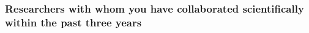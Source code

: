 \documentclass[10pt,fleqn,twoside]{article}
\newcommand{\Tcol}{\color{blue}}
\begin{document}
\subsubsection{\Tcol Researchers with whom you have collaborated scientifically within the past three years}


\end{document}
